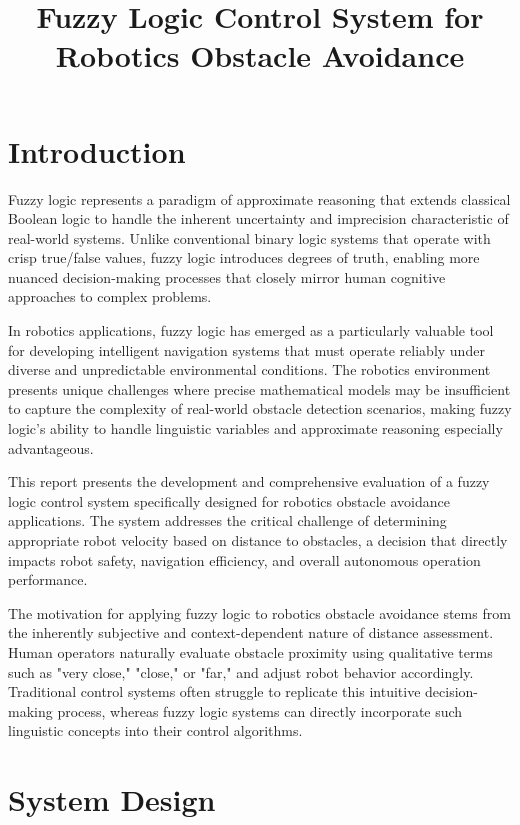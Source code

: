 \documentclass[11pt,a4paper]{article}
\title{Fuzzy Logic Control System for Robotics Obstacle Avoidance}
\date{}
\begin{document}
\maketitle

\section{Introduction}

Fuzzy logic represents a paradigm of approximate reasoning that extends classical Boolean logic to handle the inherent uncertainty and imprecision characteristic of real-world systems. Unlike conventional binary logic systems that operate with crisp true/false values, fuzzy logic introduces degrees of truth, enabling more nuanced decision-making processes that closely mirror human cognitive approaches to complex problems.

In robotics applications, fuzzy logic has emerged as a particularly valuable tool for developing intelligent navigation systems that must operate reliably under diverse and unpredictable environmental conditions. The robotics environment presents unique challenges where precise mathematical models may be insufficient to capture the complexity of real-world obstacle detection scenarios, making fuzzy logic's ability to handle linguistic variables and approximate reasoning especially advantageous.

This report presents the development and comprehensive evaluation of a fuzzy logic control system specifically designed for robotics obstacle avoidance applications. The system addresses the critical challenge of determining appropriate robot velocity based on distance to obstacles, a decision that directly impacts robot safety, navigation efficiency, and overall autonomous operation performance.

The motivation for applying fuzzy logic to robotics obstacle avoidance stems from the inherently subjective and context-dependent nature of distance assessment. Human operators naturally evaluate obstacle proximity using qualitative terms such as "very close," "close," or "far," and adjust robot behavior accordingly. Traditional control systems often struggle to replicate this intuitive decision-making process, whereas fuzzy logic systems can directly incorporate such linguistic concepts into their control algorithms.

\section{System Design}
\end{document}
